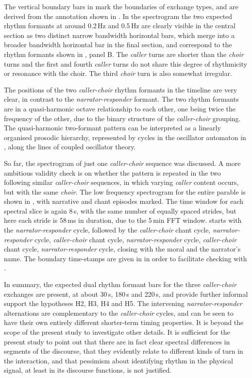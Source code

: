 \documentclass[output=paper,colorlinks,citecolor=brown]{langscibook}
\begin{document}
The vertical boundary bars in  mark the boundaries of exchange types, and are derived from the annotation shown in . In the spectrogram the two expected rhythm formants at around 0.2\,Hz and 0.5\,Hz are clearly visible in the central section as two distinct narrow bandwidth horizontal bars, which merge into a broader bandwidth horizontal bar in the final section, and correspond to the rhythm formants shown in , panel B. The \textit{caller} turns are shorter than the \textit{choir} turns and the first and fourth \textit{caller} turns do not share this degree of rhythmicity or resonance with the choir. The third \textit{choir} turn is also somewhat irregular.

The positions of the two \textit{caller-choir} rhythm formants in the timeline are very clear, in contrast to the \textit{narrator-responder} formant. The two rhythm formants are in a quasi-harmonic octave relationship to each other, one being twice the frequency of the other, due to the binary structure of the \textit{caller-choir} grouping. The quasi-harmonic two-formant pattern can be interpreted as a linearly organised prosodic hierarchy, represented by cycles in the oscillator automaton in , along the lines of coupled oscillator theory.

So far, the spectrogram of just one \textit{caller-choir} sequence was discussed. A more ambitious validity check is on whether the pattern is repeated in the two following similar \textit{caller-choir} sequences, in which varying \textit{caller} content occurs, but with the same \textit{choir}. The low frequency spectrogram for the entire parable is shown in , with narrative and chant episodes marked. The time window for each spectral slice is again 8\,s, with the same number of equally spaced strides, but here each stride is 58\,ms in duration, due to the 5\,min FFT window.  starts with the \textit{narrator-responder} cycle, followed by the \textit{caller-choir} chant cycle, \textit{narrator-responder} cycle, \textit{caller-choir} chant cycle, \textit{narrator-responder} cycle, \textit{caller-choir} chant cycle, \textit{narrator-responder} cycle, closing with the moral and the narrator's name. The boundary time-stamps are given in  in order to facilitate checking with .

In summary, the expected dual rhythm formant bars for the three \textit{caller-choir} exchanges are present, at about 30\,s, 180\,s and 220\,s, and provide further informal support the hypotheses H2, H3, H4 and H5. The intervening \textit{narrator-responder} alternations are complementary to the \textit{caller-choir} cycles, and can be seen to have their own entirely different shorter-term timing properties. It is beyond the scope of the present study to investigate other details. It is sufficient for the present study to point out that there are in fact clear spectral differences in segments of the discourse, that they evidently relate to different kinds of turn in the interaction, and that pessimism about identifying rhythm in the physical signal, at least in its discourse functions, is not justified.
\end{document}
